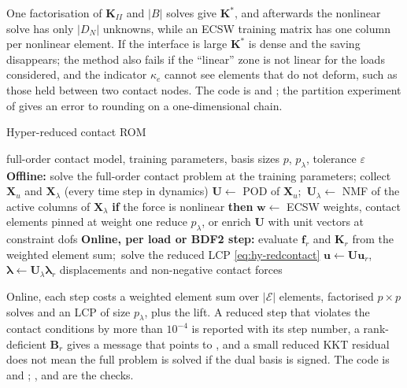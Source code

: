 One factorisation of $\bm K_{II}$ and $|B|$ solves give $\bm K^\ast$, and afterwards the nonlinear solve has only $|D_N|$ unknowns, while an ECSW training matrix has one column per nonlinear element. If the interface is large $\bm K^\ast$ is dense and the saving disappears; the method also fails if the ``linear'' zone is not linear for the loads considered, and the indicator $\kappa_e$ cannot see elements that do not deform, such as those held between two contact nodes. The code is  and ; the partition experiment of  gives an error to rounding on a one-dimensional chain.

\begin{algbox}{Hyper-reduced contact ROM}
\begin{pseudo}
\Require full-order contact model, training parameters, basis sizes $p$, $p_\lambda$, tolerance $\varepsilon$
\State \textbf{Offline:}
\State solve the full-order contact problem at the training parameters; collect $\bm X_u$ and $\bm X_\lambda$ (every time step in dynamics)
\State $\bm U\gets$ POD of $\bm X_u$;\ $\bm U_\lambda\gets$ NMF of the active columns of $\bm X_\lambda$ 
\State \textbf{if} the force is nonlinear \textbf{then} $\bm w\gets$ ECSW weights, contact elements pinned at weight one
  \State reduce $p_\lambda$, or enrich $\bm U$ with unit vectors at constraint dofs
\EndIf
\State \textbf{Online, per load or BDF2 step:}
\Repeat
  \State evaluate $\bm f_r$ and $\bm K_r$ from the weighted element sum;\ solve the reduced LCP \eqref{eq:hy-redcontact} 
\State $\bm u\gets\bm U\bm u_r$,\ \ $\bm\lambda\gets\bm U_\lambda\bm\lambda_r$
\Ensure displacements and non-negative contact forces
\end{pseudo}
\end{algbox}

Online, each step costs a weighted element sum over $|\mathcal E|$ elements, factorised $p\times p$ solves and an LCP of size $p_\lambda$, plus the lift. A reduced step that violates the contact conditions by more than $10^{-4}$ is reported with its step number, a rank-deficient $\bm B_r$ gives a message that points to , and a small reduced KKT residual does not mean the full problem is solved if the dual basis is signed. The code is  and ; ,  and  are the checks.

